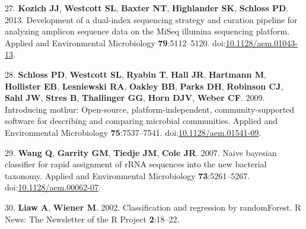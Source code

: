 \documentclass[11pt,]{article}
\begin{document}
\hypertarget{ref-Kozich2013}{}
27. \textbf{Kozich JJ}, \textbf{Westcott SL}, \textbf{Baxter NT},
\textbf{Highlander SK}, \textbf{Schloss PD}. 2013. Development of a
dual-index sequencing strategy and curation pipeline for analyzing
amplicon sequence data on the MiSeq illumina sequencing platform.
Applied and Environmental Microbiology \textbf{79}:5112--5120.
doi:\href{https://doi.org/10.1128/aem.01043-13}{10.1128/aem.01043-13}.

\hypertarget{ref-Schloss2009}{}
28. \textbf{Schloss PD}, \textbf{Westcott SL}, \textbf{Ryabin T},
\textbf{Hall JR}, \textbf{Hartmann M}, \textbf{Hollister EB},
\textbf{Lesniewski RA}, \textbf{Oakley BB}, \textbf{Parks DH},
\textbf{Robinson CJ}, \textbf{Sahl JW}, \textbf{Stres B},
\textbf{Thallinger GG}, \textbf{Horn DJV}, \textbf{Weber CF}. 2009.
Introducing mothur: Open-source, platform-independent,
community-supported software for describing and comparing microbial
communities. Applied and Environmental Microbiology
\textbf{75}:7537--7541.
doi:\href{https://doi.org/10.1128/aem.01541-09}{10.1128/aem.01541-09}.

\hypertarget{ref-Wang2007}{}
29. \textbf{Wang Q}, \textbf{Garrity GM}, \textbf{Tiedje JM},
\textbf{Cole JR}. 2007. Naive bayesian classifier for rapid assignment
of rRNA sequences into the new bacterial taxonomy. Applied and
Environmental Microbiology \textbf{73}:5261--5267.
doi:\href{https://doi.org/10.1128/aem.00062-07}{10.1128/aem.00062-07}.

\hypertarget{ref-Liaw2002}{}
30. \textbf{Liaw A}, \textbf{Wiener M}. 2002. Classification and
regression by randomForest. R News: The Newsletter of the R Project
\textbf{2}:18--22.
\end{document}
